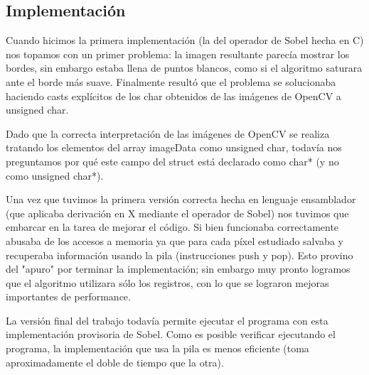 \subsection{Implementación}

Cuando hicimos la primera implementación (la del operador de Sobel hecha en C) nos topamos con un primer problema: la imagen resultante parecía mostrar los bordes, sin embargo estaba llena de puntos blancos, como si el algoritmo saturara ante el borde más suave. Finalmente resultó que el problema se solucionaba haciendo casts explícitos de los char obtenidos de las imágenes de OpenCV a unsigned char.

Dado que la correcta interpretación de las imágenes de OpenCV se realiza tratando los elementos del array imageData como unsigned char, todavía nos preguntamos por qué este campo del struct está declarado como char* (y no como unsigned char*).

%
%

Una vez que tuvimos la primera versión correcta hecha en lenguaje ensamblador (que aplicaba derivación en X mediante el operador de Sobel) nos tuvimos que embarcar en la tarea de mejorar el código. Si bien funcionaba correctamente abusaba de los accesos a memoria ya que para cada píxel estudiado salvaba y recuperaba información usando la pila (instrucciones push y pop). Esto provino del "apuro" por terminar la implementación; sin embargo muy pronto logramos que el algoritmo utilizara sólo los registros, con lo que se lograron mejoras importantes de performance.

La versión final del trabajo todavía permite ejecutar el programa con esta implementación provisoria de Sobel. Como es posible verificar ejecutando el programa, la implementación que usa la pila es menos eficiente (toma aproximadamente el doble de tiempo que la otra).
